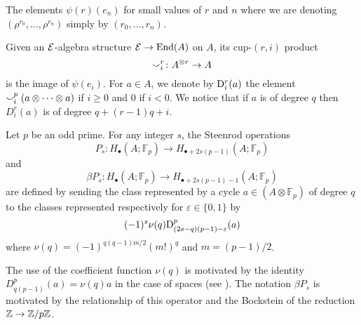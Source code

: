 \begin{table}
	\centering
	
	\caption{The elements $\psi(r)(e_n)$ for small values of $r$ and $n$ where we are denoting $(\rho^{r_0}, \dots, \rho^{r_n})$ simply by $(r_0, \dots, r_n)$.}
	\label{f:small values of psi}
\end{table}

\sssec

Given an $\mathcal{E}$-algebra structure $\mathcal{E} \to \mathrm{End}(A)$ on $A$, its cup-$(r,i)$ product
\[
\smallsmile_i^r \colon A^{\otimes r} \to A
\]
is the image of $\psi(e_i)$.
For $a \in A$, we denote by $\mathrm{D}_i^r(a)$ the element $\smallsmile_i^p(a \otimes\dotsb\otimes a)$ if $i \geq 0$ and $0$ if $i<0$.
We notice that if $a$ is of degree $q$ then $D^r_i(a)$ is of degree $q + (r-1)q + i$.

\sssec
Let $p$ be an odd prime.
For any integer $s$, the Steenrod operations
\begin{equation*}
	P_s \colon H_\bullet(A; \mathbb{F}_p) \to H_{\bullet + 2s(p-1)}(A; \mathbb{F}_p)
\end{equation*}
and
\begin{equation*}
	\beta P_s \colon H_\bullet(A; \mathbb{F}_p) \to H_{\bullet + 2s(p-1) - 1}(A; \mathbb{F}_p)
\end{equation*}
are defined by sending the class represented by a cycle $a \in (A \otimes \mathbb{F}_p)$ of degree $q$ to the classes represented respectively for $\varepsilon \in\{0,1\}$ by
\begin{equation*}
	(-1)^s \nu(q) \mathrm{D}^p_{(2s-q)(p-1)-\varepsilon}(a)
\end{equation*}
where $\nu(q) = (-1)^{q(q-1)m/2}(m!)^q$ and $m = (p-1)/2$.


\begin{remark*}
	The use of the coefficient function $\nu(q)$ is motivated by the identity $D_{q(p-1)}^p(a) = \nu(q)a$ in the case of spaces (see \cite[(6.1)]{steenrod1953cyclic}).
	The notation $\beta P_s$ is motivated by the relationship of this operator and the Bockstein of the reduction $\mathbb{Z} \to \mathbb{Z}/p\mathbb{Z}$.
\end{remark*}